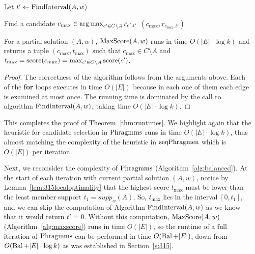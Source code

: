 \begin{algorithm}[htb]
\SetAlgoLined
{}
Let $t'\leftarrow \operatorname{FindInterval}(A,w)$\;

Find a candidate $c_{\max}\in\operatorname*{arg\,max}_{c'\in C\setminus A} r_{c', t'}$\;
\Return $(c_{\max}, r_{c_{\max}, t'})$\;
 \caption{$\maxscore(A,w)$}
\label{alg:maxscore}
\end{algorithm}

\begin{lemma}\label{lem:maxscore}
For a partial solution $(A,w)$, $\maxscore(A,w)$ runs in time $O(|E|\cdot \log k)$ and returns a tuple $(c_{\max}, t_{\max})$ such that $c_{\max}\in C\setminus A$ and $t_{\max}=\operatorname{score}(c_{\max})=\max_{c'\in C\setminus A} \operatorname{score}(c')$.
\end{lemma}
\begin{proof}
The correctness of the algorithm follows from the arguments above. 
Each of the \textbf{for} loops executes in time $O(|E|)$ because in each one of them each edge is examined at most once. 
The running time is dominated by the call to algorithm $\operatorname{FindInterval}(A,w)$, taking time $O(|E|\cdot \log k)$.
\end{proof}

This completes the proof of Theorem~\ref{thm:runtimes}. 
We highlight again that the heuristic for candidate selection in $\operatorname{Phragmms}$ runs in time $O(|E|\cdot \log k)$, thus almost matching the complexity of the heuristic in $\operatorname{seqPhragmen}$ which is $O(|E|)$ per iteration. 

Next, we reconsider the complexity of $\operatorname{Phragmms}$ (Algorithm~\ref{alg:balanced}). 
At the start of each iteration with current partial solution $(A,w)$, notice by Lemma~\ref{lem:315localoptimality} that the highest score $t_{\max}$ must be lower than the least member support $t_1=supp_w(A)$. So, $t_{\max}$ lies in the interval $[0,t_1]$, and we can skip the computation of Algorithm $\operatorname{FindInterval}(A,w)$ as we know that it would return $t'=0$. 
Without this computation, $\maxscore(A,w)$ (Algorithm~\ref{alg:maxscore}) runs in time $O(|E|)$, so the runtime of a full iteration of $\operatorname{Phragmms}$ can be performed in time $O(\operatorname{Bal} + |E|)$, down from $O(\operatorname{Bal} + |E|\cdot \log k)$ as was established in Section~\ref{s:315}.

